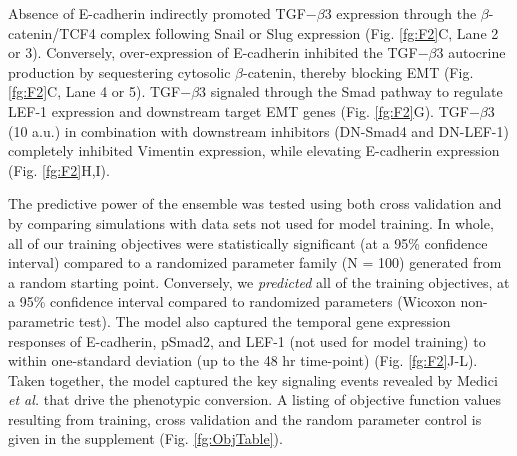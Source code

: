 \documentclass[12pt]{article}
\begin{document}
Absence of E-cadherin indirectly promoted TGF$-\beta$3 expression through the $\beta$-catenin/TCF4 complex following Snail or Slug expression (Fig. \ref{fg:F2}C, Lane 2 or 3).
Conversely, over-expression of E-cadherin inhibited the TGF$-\beta$3 autocrine production by sequestering cytosolic $\beta$-catenin, thereby blocking EMT (Fig. \ref{fg:F2}C, Lane 4 or 5).
TGF$-\beta$3 signaled through the Smad pathway to regulate LEF-1 expression and downstream target EMT genes (Fig. \ref{fg:F2}G).
TGF$-\beta$3 (10 a.u.) in combination with downstream inhibitors (DN-Smad4 and DN-LEF-1) completely inhibited Vimentin expression, while elevating E-cadherin expression (Fig. \ref{fg:F2}H,I).

The predictive power of the ensemble was tested using both cross validation and by comparing simulations with data sets not used for model training.
In whole, all of our training objectives were statistically significant (at a 95\% confidence interval) compared to a randomized parameter family (N = 100)
generated from a random starting point. Conversely, we \emph{predicted} all of the training objectives, at a 95\% confidence interval compared to randomized parameters (Wicoxon non-parametric test). The model also captured the temporal gene expression responses of E-cadherin, pSmad2, and LEF-1 (not used for model training) to within one-standard deviation (up to the 48 hr time-point) (Fig. \ref{fg:F2}J-L). Taken together, the model captured the key signaling events revealed by Medici \emph{et al.} \citep{Medici:2008fk} that drive the phenotypic conversion.
A listing of objective function values resulting from training, cross validation and the random parameter control is given in the supplement (Fig. \ref{fg:ObjTable}).
\end{document}
